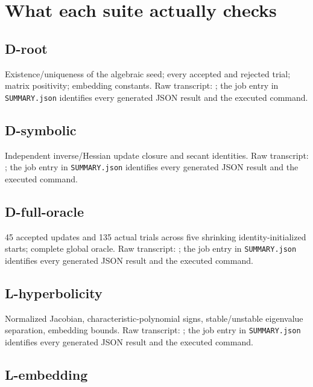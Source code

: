 \documentclass[10pt,oneside,openany]{book}
\theoremstyle{remark}\newtheorem{remark}{Remark}[chapter]
\begin{document}
\section{What each suite actually checks}\label{what-each-suite-actually-checks}

\subsection{D-root}\label{d-root}

Existence/uniqueness of the algebraic seed; every accepted and rejected trial; matrix positivity; embedding constants. Raw transcript: ; the job entry in \texttt{SUMMARY.json} identifies every generated JSON result and the executed command.

\subsection{D-symbolic}\label{d-symbolic}

Independent inverse/Hessian update closure and secant identities. Raw transcript: ; the job entry in \texttt{SUMMARY.json} identifies every generated JSON result and the executed command.

\subsection{D-full-oracle}\label{d-full-oracle}

45 accepted updates and 135 actual trials across five shrinking identity-initialized starts; complete global oracle. Raw transcript: ; the job entry in \texttt{SUMMARY.json} identifies every generated JSON result and the executed command.

\subsection{L-hyperbolicity}\label{l-hyperbolicity}

Normalized Jacobian, characteristic-polynomial signs, stable/unstable eigenvalue separation, embedding bounds. Raw transcript: ; the job entry in \texttt{SUMMARY.json} identifies every generated JSON result and the executed command.

\subsection{L-embedding}\label{l-embedding}
\end{document}
